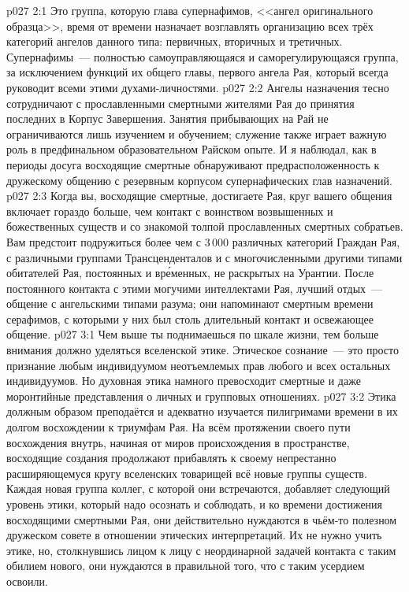 \vs p027 2:1 Это группа, которую глава супернафимов, <<ангел оригинального образца>>, время от времени назначает возглавлять организацию всех трёх категорий ангелов данного типа: первичных, вторичных и третичных. Супернафимы~--- полностью самоуправляющаяся и саморегулирующаяся группа, за исключением функций их общего главы, первого ангела Рая, который всегда руководит всеми этими духами\hyp{}личностями.
\vs p027 2:2 Ангелы назначения тесно сотрудничают с прославленными смертными жителями Рая до принятия последних в Корпус Завершения. Занятия прибывающих на Рай не ограничиваются лишь изучением и обучением; служение также играет важную роль в предфинальном образовательном Райском опыте. И я наблюдал, как в периоды досуга восходящие смертные обнаруживают предрасположенность к дружескому общению с резервным корпусом супернафических глав назначений.
\vs p027 2:3 Когда вы, восходящие смертные, достигаете Рая, круг вашего общения включает гораздо больше, чем контакт с воинством возвышенных и божественных существ и со знакомой толпой прославленных смертных собратьев. Вам предстоит подружиться более чем с 3\,000 различных категорий Граждан Рая, с различными группами Трансценденталов и с многочисленными другими типами обитателей Рая, постоянных и вр\'еменных, не раскрытых на Урантии. После постоянного контакта с этими могучими интеллектами Рая, лучший отдых~--- общение с ангельскими типами разума; они напоминают смертным времени серафимов, с которыми у них был столь длительный контакт и освежающее общение.
\vs p027 3:1 Чем выше ты поднимаешься по шкале жизни, тем больше внимания должно уделяться вселенской этике. Этическое сознание~--- это просто признание любым индивидуумом неотъемлемых прав любого и всех остальных индивидуумов. Но духовная этика намного превосходит смертные и даже моронтийные представления о личных и групповых отношениях.
\vs p027 3:2 Этика должным образом преподаётся и адекватно изучается пилигримами времени в их долгом восхождении к триумфам Рая. На всём протяжении своего пути восхождения внутрь, начиная от миров происхождения в пространстве, восходящие создания продолжают прибавлять к своему непрестанно расширяющемуся кругу вселенских товарищей всё новые группы существ. Каждая новая группа коллег, с которой они встречаются, добавляет следующий уровень этики, который надо осознать и соблюдать, и ко времени достижения восходящими смертными Рая, они действительно нуждаются в чьём\hyp{}то полезном дружеском совете в отношении этических интерпретаций. Их не нужно учить этике, но, столкнувшись лицом к лицу с неординарной задачей контакта с таким обилием нового, они нуждаются в правильной  того, что с таким усердием освоили.
